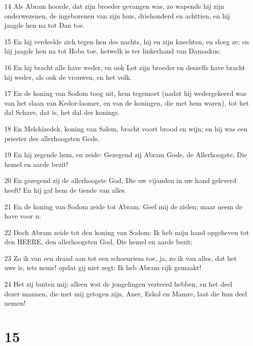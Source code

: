 \par 14 Als Abram hoorde, dat zijn broeder gevangen was, zo wapende hij zijn onderwezenen, de ingeborenen van zijn huis, driehonderd en achttien, en hij jaagde hen na tot Dan toe.
\par 15 En hij verdeelde zich tegen hen des nachts, hij en zijn knechten, en sloeg ze; en hij jaagde hen na tot Hoba toe, hetwelk is ter linkerhand van Damaskus.
\par 16 En hij bracht alle have weder, en ook Lot zijn broeder en deszelfs have bracht hij weder, als ook de vrouwen, en het volk.
\par 17 En de koning van Sodom toog uit, hem tegemoet (nadat hij wedergekeerd was van het slaan van Kedor-laomer, en van de koningen, die met hem waren), tot het dal Schave, dat is, het dal des konings.
\par 18 En Melchizedek, koning van Salem, bracht voort brood en wijn; en hij was een priester des allerhoogsten Gods.
\par 19 En hij zegende hem, en zeide: Gezegend zij Abram Gode, de Allerhoogste, Die hemel en aarde bezit!
\par 20 En gezegend zij de allerhoogste God, Die uw vijanden in uw hand geleverd heeft! En hij gaf hem de tiende van alles.
\par 21 En de koning van Sodom zeide tot Abram: Geef mij de zielen; maar neem de have voor u.
\par 22 Doch Abram zeide tot den koning van Sodom: Ik heb mijn hand opgeheven tot den HEERE, den allerhoogsten God, Die hemel en aarde bezit;
\par 23 Zo ik van een draad aan tot een schoenriem toe, ja, zo ik van alles, dat het uwe is, iets neme! opdat gij niet zegt: Ik heb Abram rijk gemaakt!
\par 24 Het zij buiten mij; alleen wat de jongelingen verteerd hebben, en het deel dezer mannen, die met mij getogen zijn, Aner, Eskol en Mamre, laat die hun deel nemen!

\chapter{15}


